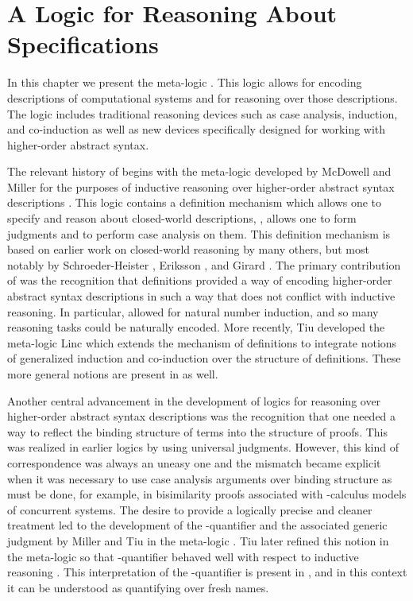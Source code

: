 
\chapter{A Logic for Reasoning About Specifications}
\label{ch:meta-logic}

In this chapter we present the meta-logic \logic. This logic allows
for encoding descriptions of computational systems and for reasoning
over those descriptions. The logic includes traditional reasoning
devices such as case analysis, induction, and co-induction as well as
new devices specifically designed for working with higher-order abstract
syntax.

The relevant history of \logic begins with the meta-logic \FOLDN
developed by McDowell and Miller for the purposes of inductive
reasoning over higher-order abstract syntax descriptions
\cite{mcdowell02tocl, mcdowell00tcs}. This logic contains a definition
mechanism which allows one to specify and reason about closed-world
descriptions, \ie, allows one to form judgments and to perform case
analysis on them. This definition mechanism is based on earlier work
on closed-world reasoning by many others, but most notably by
Schroeder-Heister \cite{schroeder-Heister93lics}, Eriksson
\cite{eriksson91elp}, and Girard \cite{girard92mail}. The primary
contribution of \FOLDN was the recognition that definitions provided a
way of encoding higher-order abstract syntax descriptions in such a
way that does not conflict with inductive reasoning. In particular,
\FOLDN allowed for natural number induction, and so many reasoning
tasks could be naturally encoded. More recently, Tiu \cite{tiu04phd}
developed the meta-logic Linc which extends the mechanism of
definitions to integrate notions of generalized induction and
co-induction over the structure of definitions. These more general
notions are present in \logic as well.

Another central advancement in the development of logics for reasoning
over higher-order abstract syntax descriptions was the recognition
that one needed a way to reflect the binding structure of terms into
the structure of proofs. This was realized in earlier logics by using
universal judgments. However, this kind of correspondence was always
an uneasy one and the mismatch became explicit when it was necessary
to use case analysis arguments over binding structure as must be done,
for example, in bisimilarity proofs associated with -calculus
models of concurrent systems. The desire to provide a logically
precise and cleaner treatment led to the development of the
-quantifier and the associated generic judgment by Miller and
Tiu in the meta-logic \foldnb \cite{miller05tocl}. Tiu later refined
this notion in the meta-logic \LG so that -quantifier behaved
well with respect to inductive reasoning \cite{tiu06lfmtp}. This
interpretation of the -quantifier is present in \logic, and in
this context it can be understood as quantifying over fresh names.

